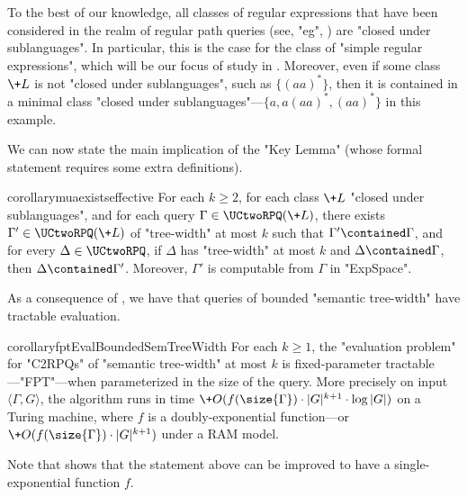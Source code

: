 To the best of our knowledge,
all classes of regular expressions that have been considered in the realm of regular path queries (see, "eg", \cite[\S1]{FigueiraEtal2020Containment}) are "closed under sublanguages". In particular, this is
the case for the class of "simple regular expressions", which will be our focus of study in . Moreover, even if some class $\+L$
is not "closed under sublanguages", such as $\{(aa)^*\}$,
then it is contained in a minimal class "closed under sublanguages"---$\{a, a(aa)^*, (aa)^*\}$ in 
this example.

We can now state the main implication of the "Key Lemma" (whose formal statement requires some extra definitions).
\begin{restatable*}{corollary}{muaexistseffective}
    \AP\label{cor:mua-exists-effective}
    For each $k \geq 2$, for each class $\+L$ "closed under sublanguages",
    and for each query $\Gamma \in \UCtwoRPQ(\+L)$,
    there exists $\Gamma' \in \UCtwoRPQ(\+L)$ of "tree-width" at most $k$ 
    such that
    $\Gamma' \contained \Gamma$, and for every $\Delta \in \UCtwoRPQ$, if $\Delta$ has
    "tree-width" at most $k$ and $\Delta \contained \Gamma$, then $\Delta \contained \Gamma'$.
    Moreover, $\Gamma'$ is computable from $\Gamma$ in "ExpSpace".
\end{restatable*}

As a consequence of , we have that queries of bounded "semantic tree-width" have tractable evaluation.
\begin{restatable*}{corollary}{fptEvalBoundedSemTreeWidth}
	\AP\label{coro:fpt-eval-bounded-semtreewidth}
	For each $k\geq 1$, the "evaluation problem" for "C2RPQs" of "semantic tree-width"
	at most $k$ is fixed-parameter tractable---"FPT"---when parameterized in the size of
	the query. More precisely on input $\langle \Gamma, G \rangle$,
	the algorithm runs in time
	$\+O(f(\size{\Gamma})\cdot |G|^{k+1} \cdot \log{|G|})$ on a Turing machine, where $f$ is a doubly-exponential function---or $\+O(f(\size{\Gamma})\cdot |G|^{k+1})$ under a RAM model.
\end{restatable*}
Note that \cite[Theorem~22]{FeierGogaczMurlak24Treewidth} shows that the statement above can be improved to have a single-exponential function $f$.

